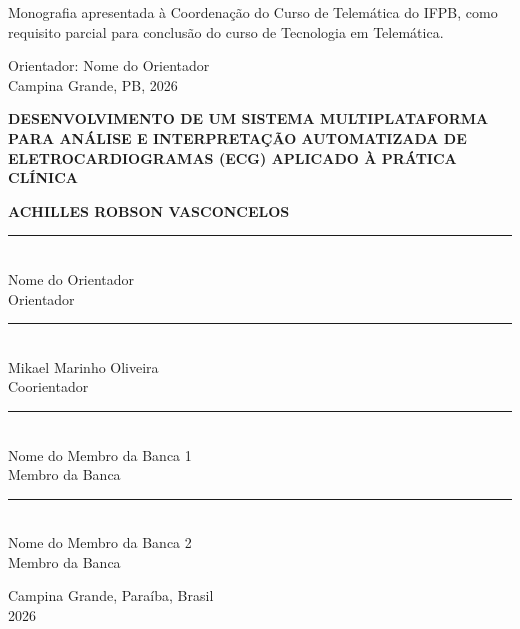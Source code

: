 \documentclass[portuguese,12pt,oneside,a4paper]{book}
\begin{document}
    \begin{flushright} 
        \begin{minipage}[left]{0.5\linewidth}
            Monografia apresentada à Coordenação do Curso de Telemática do IFPB, como requisito parcial para conclusão do curso de Tecnologia em Telemática.                       
        \end{minipage}
    \end{flushright}                               

\begin{center}  
    \vskip 2cm
    Orientador: Nome do Orientador\\
    \vskip 1.5cm
    \normalsize{Campina Grande, PB, 2026}
\end{center}

\newpage

\newpage
\thispagestyle{empty}
    \begin{center}
        
        \textbf{\LARGE{DESENVOLVIMENTO DE UM SISTEMA MULTIPLATAFORMA PARA ANÁLISE E INTERPRETAÇÃO AUTOMATIZADA DE ELETROCARDIOGRAMAS (ECG) APLICADO À PRÁTICA CLÍNICA}}\\

        \vspace*{3cm}

        \textbf{ACHILLES ROBSON VASCONCELOS}
    
        \vskip 2cm

        \rule{10cm}{0.1mm}\\
        Nome do Orientador\\
        Orientador
        
        \vskip 2cm

        \rule{10cm}{0.1mm}\\
        Mikael Marinho Oliveira\\
        Coorientador
        
        \vskip 2cm
                
        \rule{10cm}{0.1mm}\\
        Nome do Membro da Banca 1\\
        Membro da Banca
            
        \vskip 2cm
        
        \rule{10cm}{0.1mm}\\
        Nome do Membro da Banca 2\\
        Membro da Banca
            
        \vskip 1cm
            
        Campina Grande, Paraíba, Brasil\\
        2026

    \end{center}
\pagebreak
\end{document}
